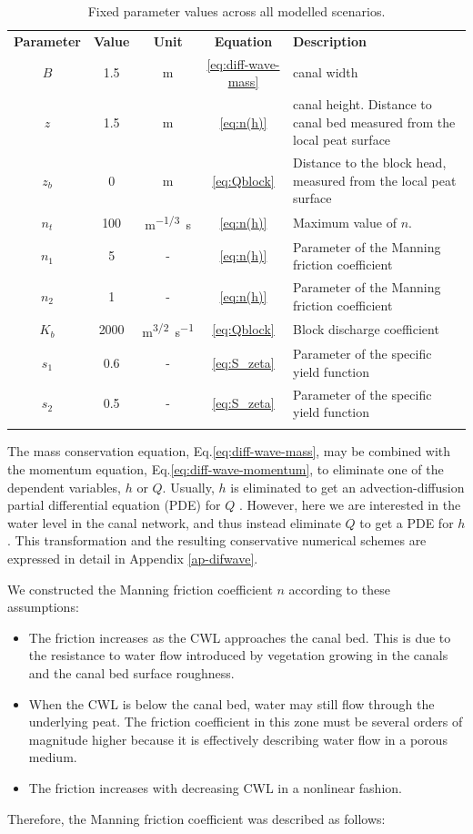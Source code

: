 \documentclass[bg, manuscript]{copernicus}
\begin{document}
\begin{table}[t] 
\caption{Fixed parameter values across all modelled scenarios.}
\label{tab:rest_of_params} 
\begin{tabular} {c c c c l}
\tophline
\textbf{Parameter} & \textbf{Value} & \textbf{Unit} &  \textbf{Equation} & \textbf{Description} \\
\middlehline
$B$ & 1.5 & \unit{m} & \eqref{eq:diff-wave-mass} & canal width \\
$z$ & 1.5 & \unit{m} & \eqref{eq:n(h)} & canal height. Distance to canal bed measured from the local peat surface \\
$z_b$ & 0 & \unit{m} & \eqref{eq:Qblock} & Distance to the block head, measured from the local peat surface \\
$n_t$ & 100 & \unit{m^{-1/3}s} & \eqref{eq:n(h)} &  Maximum value of $n$.\\
$n_1$ & 5 & - & \eqref{eq:n(h)} & Parameter of the Manning friction coefficient\\
$n_2$ & 1 & - & \eqref{eq:n(h)} &  Parameter of the Manning friction coefficient \\
$K_b$ & 2000 & \unit{m^{3/2}s^{-1}} & \eqref{eq:Qblock} & Block discharge coefficient \\
$s_1$ & 0.6 & - & \eqref{eq:S_zeta} & Parameter of the specific yield function\\
$s_2$ & 0.5 & - & \eqref{eq:S_zeta} & Parameter of the specific yield function\\
\bottomhline
\end{tabular}
\end{table}


The mass conservation equation, Eq.\eqref{eq:diff-wave-mass}, may be combined with the momentum equation, Eq.\eqref{eq:diff-wave-momentum}, to eliminate one of the dependent variables, $h$ or $Q$.
Usually, $h$ is eliminated to get an advection-diffusion partial differential equation (PDE) for $Q$ \citep{novakHydraulicModellingIntroduction2010, szymkiewiczNumericalModelingOpen2010}.
However, here we are interested in the water level in the canal network, and thus instead eliminate $Q$ to get a PDE for $h$.
This transformation and the resulting conservative numerical schemes are expressed in detail in Appendix \ref{ap-difwave}.

We constructed the Manning friction coefficient $n$ according to these assumptions:
\begin{itemize}
    \item The friction increases as the CWL approaches the canal bed. This is due to the resistance to water flow introduced by vegetation growing in the canals and the canal bed surface roughness.
    \item When the CWL is below the canal bed, water may still flow through the underlying peat. The friction coefficient in this zone must be several orders of magnitude higher because it is effectively describing water flow in a porous medium.
    \item The friction increases with decreasing CWL in a nonlinear fashion.
\end{itemize}
Therefore, the Manning friction coefficient was described as follows:
\end{document}
